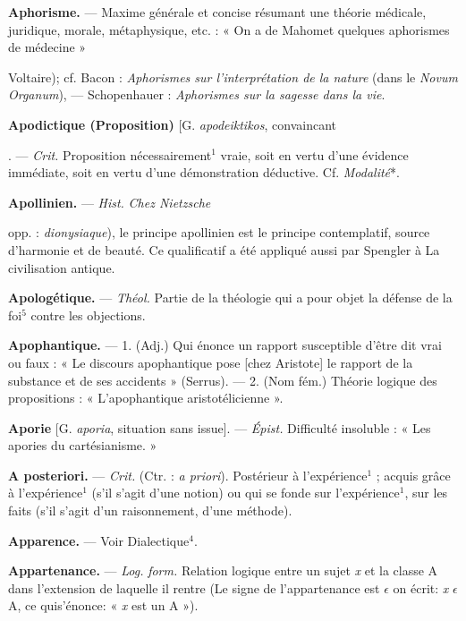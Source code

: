 \begin{itemize}[leftmargin=1cm, label=, itemsep=1pt]
{{{\item {\bf Aphorisme.} — Maxime générale et
concise résumant une théorie médicale, juridique, morale,
métaphysique, etc. : « On a de Mahomet quelques aphorismes
de médecine » {Voltaire); cf. Bacon : {\it Aphorismes sur
l'interprétation de la nature} (dans le
{\it Novum Organum}), — Schopenhauer :
{\it Aphorismes sur la sagesse dans la vie}.

\item {\bf Apodictique (Proposition)} [G. {\it apodeiktikos}, convaincant}. — \textsf{\textit {Crit.}}
Proposition nécessairement$^1$ vraie,
soit en vertu d’une évidence immédiate, soit en vertu d’une
démonstration déductive. Cf. {\it Modalité}*.

\item {\bf Apollinien.} — \textsf{\textit {Hist.}} {\it Chez Nietzsche}
{opp. : {\it dionysiaque}), le principe
apollinien est le principe contemplatif, source d'harmonie et de
beauté. Ce qualificatif a été appliqué
aussi par Spengler à La civilisation
antique.

\item {\bf Apologétique.} — \textsf{\textit {Théol.}} Partie de la
théologie qui a pour objet la défense
de la foi$^5$ contre les objections.

\item {\bf Apophantique.} — 1. (Adj.) Qui énonce
un rapport susceptible d'être dit vrai
ou faux : « Le discours apophantique
pose [chez Aristote] le rapport de la
substance et de ses accidents » (Serrus). — 2. (Nom fém.) Théorie
logique des propositions : « L’apophantique aristotélicienne ».

\item {\bf Aporie} [G. {\it aporia}, situation sans issue].
— \textsf{\textit {Épist.}} Difficulté insoluble : « Les
apories du cartésianisme. »

\item {\bf A posteriori.} — \textsf{\textit {Crit.}} (Ctr. : {\it a priori}).
Postérieur à l’expérience$^1$ ; acquis
grâce à l'expérience$^1$ (s’il s’agit d'une
notion) ou qui se fonde sur l'expérience$^1$,
sur les faits (s’il s’agit d’un
raisonnement, d’une méthode).

\item {\bf Apparence.} — Voir Dialectique$^4$.

\item {\bf Appartenance.} — \textsf{\textit {Log.}} \textsf{\textit {form.}} Relation
logique entre un sujet {\it x} et la
classe A dans l'extension de laquelle
il rentre (Le signe de l’appartenance
est $\epsilon$ on écrit: {\it x} $\epsilon$ A, ce quis’énonce:
« {\it x} est un A »).

}}}}
\end{itemize}
